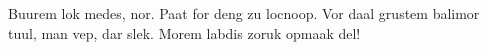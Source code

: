 \begin{box}
Buurem lok medes, nor. Paat for deng zu locnoop.
Vor daal grustem balimor tuul, man vep, dar slek.
Morem labdis zoruk opmaak del!
\end{box}
